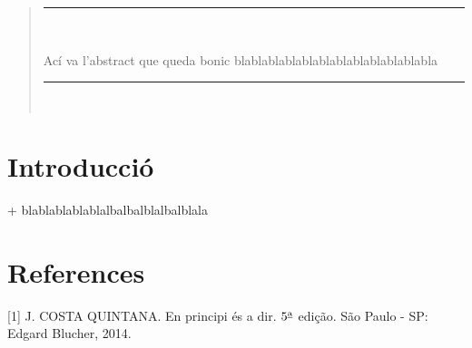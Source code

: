 \documentclass[aps,prl,reprint]{revtex4-1}
\begin{document}
	
	
	\author{Team number: 891\\ Problem A\\Aquí va el títol}
	
	\begin{abstract}
		
		\begin{center}
			
			\rule{15cm}{1pt} \\
			
		\end{center}
		
		Ací va l'abstract que queda bonic blablablablablablablablablablablabla
		\begin{center}
			
			\rule{15cm}{1pt} \\
			
		\end{center}
		
	\end{abstract}
	
	\maketitle
	\onecolumngrid\newpage\twocolumngrid
	\section{Introducció}
	+ blablablablablalbalbalblalbalblala
	

	\section{References}
	[1] J. COSTA QUINTANA. En principi és a dir. $5{\textsuperscript{\underline{a}}}$ edição. São Paulo - SP: Edgard Blucher, 2014. 
	
	
	
	
	
	
\end{document}
